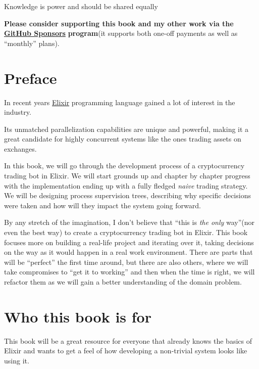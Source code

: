 \documentclass[
  oneside]{book}
\begin{document}
Knowledge is power and should be shared equally 🙏

\textbf{Please consider supporting this book and my other work via the} \href{https://github.com/sponsors/frathon}{\textbf{GitHub Sponsors}} \textbf{program}(it supports both one-off payments as well as ``monthly'' plans).

\hypertarget{preface}{%
\section*{Preface}\label{preface}}

In recent years \href{https://elixir-lang.org/}{Elixir} programming language gained a lot of interest in the industry.

Its unmatched parallelization capabilities are unique and powerful, making it a great candidate for highly concurrent systems like the ones trading assets on exchanges.

In this book, we will go through the development process of a cryptocurrency trading bot in Elixir. We will start grounds up and chapter by chapter progress with the implementation ending up with a fully fledged \emph{naive} trading strategy. We will be designing process supervision trees, describing why specific decisions were taken and how will they impact the system going forward.

By any stretch of the imagination, I don't believe that ``this is \emph{the only} way''(nor even the best way) to create a cryptocurrency trading bot in Elixir. This book focuses more on building a real-life project and iterating over it, taking decisions on the way as it would happen in a real work environment. There are parts that will be ``perfect'' the first time around, but there are also others, where we will take compromises to ``get it to working'' and then when the time is right, we will refactor them as we will gain a better understanding of the domain problem.

\hypertarget{who-this-book-is-for}{%
\section*{Who this book is for}\label{who-this-book-is-for}}

This book will be a great resource for everyone that already knows the basics of Elixir and wants to get a feel of how developing a non-trivial system looks like using it.
\end{document}
